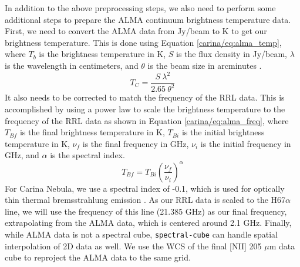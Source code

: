 In addition to the above preprocessing steps, we also need to perform some additional steps to prepare the ALMA continuum brightness temperature data.
First, we need to convert the ALMA data from Jy/beam to K to get our brightness temperature.
This is done using Equation \ref{carina/eq:alma_temp}, where $T_b$ is the brightness temperature in K, $S$ is the flux density in Jy/beam, $\lambda$ is the wavelength in centimeters, and $\theta$ is the beam size in arcminutes \parencite{rohlfs2013tools}.
\begin{equation}
    T_C = \frac{S\ \lambda^2}{2.65\ \theta^2}
    \label{carina/eq:alma_temp}
\end{equation}
It also needs to be corrected to match the frequency of the RRL data.
This is accomplished by using a power law to scale the brightness temperature to the frequency of the RRL data as shown in Equation \ref{carina/eq:alma_freq}, where $T_{Bf}$ is the final brightness temperature in K, $T_{Bi}$ is the initial brightness temperature in K, $\nu_{f}$ is the final frequency in GHz, $\nu_i$ is the initial frequency in GHz, and $\alpha$ is the spectral index.
\begin{equation}
    T_{Bf} = T_{Bi} \left( \frac{\nu_f}{\nu_i} \right)^\alpha
    \label{carina/eq:alma_freq}
\end{equation}
For Carina Nebula, we use a spectral index of -0.1, which is used for optically thin thermal bremsstrahlung emission \parencite{salatino2012spectral}.
As our RRL data is scaled to the H67$\alpha$ line, we will use the frequency of this line (21.385 GHz) as our final frequency, extrapolating from the ALMA data, which is centered around 2.1 GHz.
Finally, while ALMA data is not a spectral cube, \texttt{spectral-cube} can handle spatial interpolation of 2D data as well.
We use the WCS of the final [NII] 205 $\mu$m data cube to reproject the ALMA data to the same grid.

